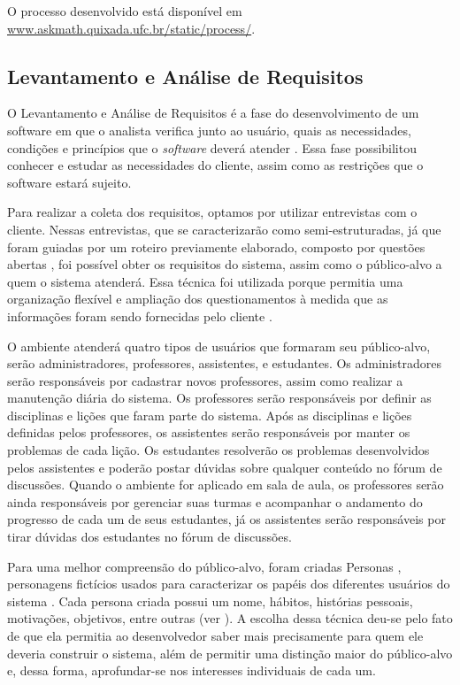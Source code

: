 O processo desenvolvido est\'a dispon\'ivel em \url{www.askmath.quixada.ufc.br/static/process/}. 

\subsection{Levantamento e Análise de Requisitos}


O Levantamento e An\'alise de Requisitos é a fase do desenvolvimento de um software em que o analista verifica junto ao usuário, quais as necessidades, condições e princípios que o \textit{software} 
deverá atender \cite{matuda2013mapas}. Essa fase possibilitou conhecer e estudar as necessidades do cliente, assim como as restrições que o software estará sujeito.

Para realizar a coleta dos requisitos, optamos por utilizar entrevistas com o cliente. Nessas entrevistas, que se caracterizarão como semi-estruturadas, já que foram guiadas por um roteiro previamente 
elaborado, composto por questões abertas \cite{belei2008uso}, foi possível obter os requisitos do sistema, assim como o público-alvo a quem o sistema atenderá. Essa técnica foi utilizada porque 
permitia uma organização flexível e ampliação dos questionamentos à medida que as informações foram sendo fornecidas pelo cliente \cite{fujisawa2000utilizaccao}.

O ambiente atender\'a quatro tipos de usu\'arios que formaram seu p\'ublico-alvo, ser\~ao administradores, professores, assistentes, e estudantes. Os administradores ser\~ao respons\'aveis por 
cadastrar 
novos professores, assim como realizar a manuten\c{c}\~ao di\'aria do sistema. Os professores ser\~ao responsáveis por definir as disciplinas e li\c{c}\~oes que faram parte do sistema. 
Ap\'os as disciplinas e li\c{c}\~oes definidas pelos professores, os assistentes ser\~ao respons\'aveis por manter os problemas de cada li\c{c}\~ao. Os estudantes resolver\~ao os problemas 
desenvolvidos pelos assistentes e poder\~ao postar d\'uvidas sobre qualquer conte\'udo no f\'orum de discuss\~oes. Quando o ambiente for aplicado em sala de aula, os professores ser\~ao ainda 
respons\'aveis por gerenciar suas turmas e acompanhar o andamento do progresso de cada um de seus estudantes, j\'a os assistentes ser\~ao responsáveis por tirar d\'uvidas dos estudantes no f\'orum 
de discuss\~oes.

Para uma melhor compreensão do público-alvo, foram criadas Personas 
\cite{pruitt2003personas}, personagens fictícios usados para caracterizar os papéis dos diferentes usuários do sistema \cite{guerra2010colaboraccao}. Cada persona criada possui um nome, hábitos, 
histórias pessoais, motivações, objetivos, entre outras (ver ). A escolha dessa técnica deu-se pelo fato de que ela permitia ao desenvolvedor saber mais precisamente para 
quem ele deveria construir o sistema, além de permitir uma distinção maior do público-alvo e, dessa forma, aprofundar-se nos interesses individuais de cada um.

